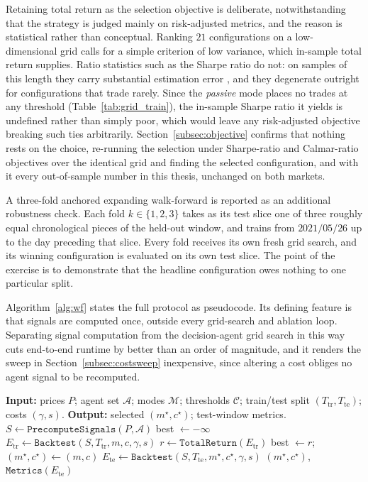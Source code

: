 Retaining total return as the selection objective is deliberate, notwithstanding that the strategy is judged mainly on risk-adjusted metrics, and the reason is statistical rather than conceptual. Ranking $21$ configurations on a low-dimensional grid calls for a simple criterion of low variance, which in-sample total return supplies. Ratio statistics such as the Sharpe ratio do not: on samples of this length they carry substantial estimation error \cite{lo2002}, and they degenerate outright for configurations that trade rarely. Since the \emph{passive} mode places no trades at any threshold (Table~\ref{tab:grid_train}), the in-sample Sharpe ratio it yields is undefined rather than simply poor, which would leave any risk-adjusted objective breaking such ties arbitrarily. Section~\ref{subsec:objective} confirms that nothing rests on the choice, re-running the selection under Sharpe-ratio and Calmar-ratio objectives over the identical grid and finding the selected configuration, and with it every out-of-sample number in this thesis, unchanged on both markets.

A three-fold anchored expanding walk-forward is reported as an additional robustness check. Each fold $k \in \{1, 2, 3\}$ takes as its test slice one of three roughly equal chronological pieces of the held-out window, and trains from $2021/05/26$ up to the day preceding that slice. Every fold receives its own fresh grid search, and its winning configuration is evaluated on its own test slice. The point of the exercise is to demonstrate that the headline configuration owes nothing to one particular split.

Algorithm~\ref{alg:wf} states the full protocol as pseudocode. Its defining feature is that signals are computed once, outside every grid-search and ablation loop. Separating signal computation from the decision-agent grid search in this way cuts end-to-end runtime by better than an order of magnitude, and it renders the sweep in Section~\ref{subsec:costsweep} inexpensive, since altering a cost obliges no agent signal to be recomputed.

\begin{algorithm}[!htbp]
\caption{Anchored walk-forward with precomputed signals}
\label{alg:wf}
\begin{algorithmic}[1]
\STATE \textbf{Input:} prices $P$; agent set $\mathcal{A}$; modes $\mathcal{M}$; thresholds $\mathcal{C}$; train/test split $(T_\text{tr}, T_\text{te})$; costs $(\gamma, s)$.
\STATE \textbf{Output:} selected $(m^\star, c^\star)$; test-window metrics.
\STATE $S \gets \mathtt{PrecomputeSignals}(P, \mathcal{A})$ 
\STATE best $\gets -\infty$
  \STATE $E_\text{tr} \gets \mathtt{Backtest}(S, T_\text{tr}, m, c, \gamma, s)$
  \STATE $r \gets \mathtt{TotalReturn}(E_\text{tr})$
    \STATE best $\gets r$; $(m^\star, c^\star) \gets (m, c)$
  \ENDIF
\ENDFOR
\STATE $E_\text{te} \gets \mathtt{Backtest}(S, T_\text{te}, m^\star, c^\star, \gamma, s)$
\RETURN $(m^\star, c^\star)$, $\mathtt{Metrics}(E_\text{te})$
\end{algorithmic}
\end{algorithm}

